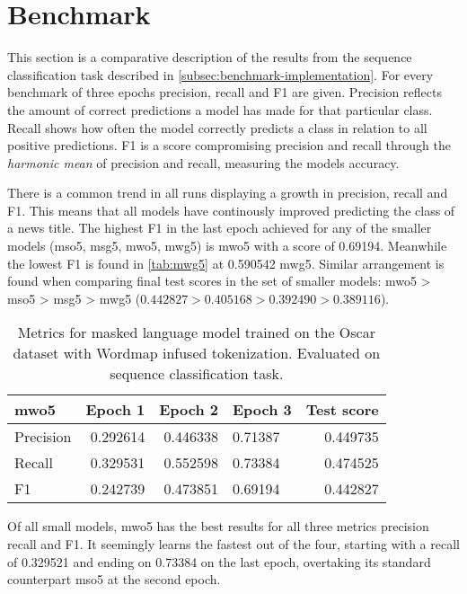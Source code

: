 \section{Benchmark}
\label{sec:benchmark}
This section is a comparative description of the results from the sequence classification task described in \autoref{subsec:benchmark-implementation}.
For every benchmark of three epochs precision, recall and F1 are given.
Precision reflects the amount of correct predictions a model has made for that particular class.
Recall shows how often the model correctly predicts a class in relation to all positive predictions.
F1 is a score compromising precision and recall through the \textit{harmonic mean} of precision and recall, measuring the models accuracy.

There is a common trend in all runs displaying a growth in precision, recall and F1.
This means that all models have continously improved predicting the class of a news title.
The highest F1 in the last epoch achieved for any of the smaller models (mso5, msg5, mwo5, mwg5) is mwo5 with a score of 0.69194.
Meanwhile the lowest F1 is found in \autoref{tab:mwg5} at 0.590542 mwg5.
Similar arrangement is found when comparing final test scores in the set of smaller models: mwo5 > mso5 > msg5 > mwg5 ($0.442827 > 0.405168 > 0.392490 > 0.389116$).

\begin{table}[h]
    \centering
    \begin{tabular}{lrrlr}
        \toprule
        \textbf{mwo5} & \textbf{Epoch 1} & \textbf{Epoch 2} & \textbf{Epoch 3} & \textbf{Test score} \\
        \midrule
        Precision & 0.292614 & 0.446338 & 0.71387 & 0.449735 \\
        Recall & 0.329531 & 0.552598 & 0.73384 & 0.474525 \\
        F1 & 0.242739 & 0.473851 & 0.69194 & 0.442827 \\
        \bottomrule
    \end{tabular}
    \caption[Metrics for model mwo5]{Metrics for masked language model trained on the Oscar dataset with Wordmap infused  tokenization. Evaluated on sequence classification task.}
    \label{tab:mwo5}
\end{table}

Of all small models, mwo5 has the best results for all three metrics precision recall and F1.
It seemingly learns the fastest out of the four, starting with a recall of 0.329521  and ending on 0.73384 on the last epoch, overtaking its standard counterpart mso5 at the second epoch.


